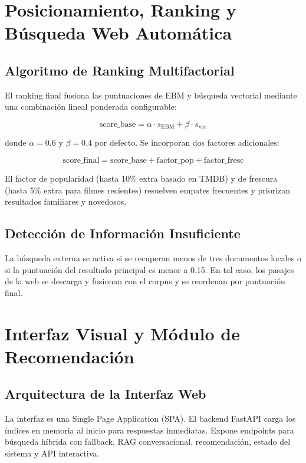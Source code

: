 \documentclass[10pt,a4paper]{llncs}
\begin{document}
\section{Posicionamiento, Ranking y Búsqueda Web Automática}

\subsection{Algoritmo de Ranking Multifactorial}

El ranking final fusiona las puntuaciones de EBM y búsqueda vectorial mediante una combinación lineal ponderada configurable:

\begin{equation}
\text{score\_base} = \alpha \cdot s_{\text{EBM}} + \beta \cdot s_{\text{vec}}
\label{eq:base}
\end{equation}

donde $\alpha=0.6$ y $\beta=0.4$ por defecto. Se incorporan dos factores adicionales:

\begin{equation}
\text{score\_final} = \text{score\_base} + \text{factor\_pop} + \text{factor\_fresc}
\label{eq:ranking}
\end{equation}

El factor de popularidad (hasta 10\% extra basado en TMDB) y de frescura (hasta 5\% extra para filmes recientes) resuelven empates frecuentes y priorizan resultados familiares y novedosos.

\subsection{Detección de Información Insuficiente}

La búsqueda externa se activa si se recuperan menos de tres documentos locales o si la puntuación del resultado principal es menor a 0.15. En tal caso, los pasajes de la web se descarga y fusionan con el corpus y se reordenan por puntuación final.

\section{Interfaz Visual y Módulo de Recomendación}

\subsection{Arquitectura de la Interfaz Web}

La interfaz es una Single Page Application (SPA). El backend FastAPI carga los índices en memoria al inicio para respuestas inmediatas. Expone endpoints para búsqueda híbrida con fallback, RAG conversacional, recomendación, estado del sistema y API interactiva.
\end{document}
